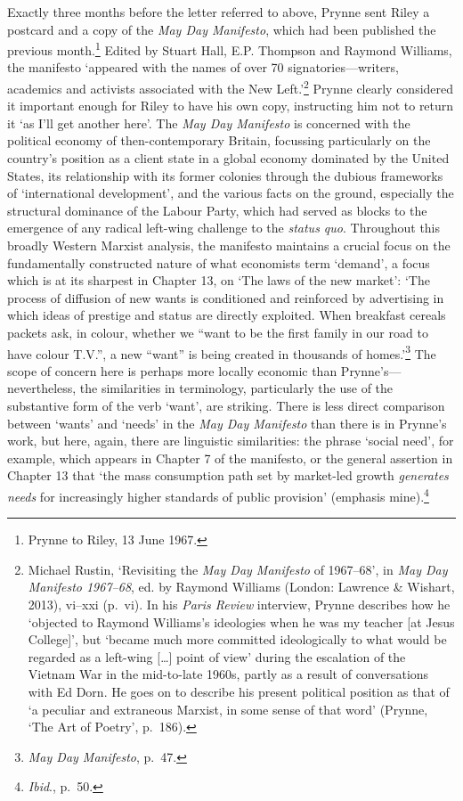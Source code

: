 \documentclass[]{article}
\begin{document}
Exactly three months before the letter referred to above, Prynne sent
Riley a postcard and a copy of the \emph{May Day Manifesto}, which had
been published the previous month.\footnote{Prynne to Riley, 13 June
  1967.} Edited by Stuart Hall, E.P. Thompson and Raymond Williams, the
manifesto `appeared with the names of over 70 signatories---writers,
academics and activists associated with the New Left.'\footnote{Michael
  Rustin, `Revisiting the \emph{May Day Manifesto} of 1967--68', in
  \emph{May Day Manifesto 1967--68}, ed. by Raymond Williams (London:
  Lawrence \& Wishart, 2013), vi--xxi (p.~vi). In his \emph{Paris
  Review} interview, Prynne describes how he `objected to Raymond
  Williams's ideologies when he was my teacher {[}at Jesus College{]}',
  but `became much more committed ideologically to what would be
  regarded as a left-wing {[}\ldots{}{]} point of view' during the
  escalation of the Vietnam War in the mid-to-late 1960s, partly as a
  result of conversations with Ed Dorn. He goes on to describe his
  present political position as that of `a peculiar and extraneous
  Marxist, in some sense of that word' (Prynne, `The Art of Poetry',
  p.~186).} Prynne clearly considered it important enough for Riley to
have his own copy, instructing him not to return it `as I'll get another
here'. The \emph{May Day Manifesto} is concerned with the political
economy of then-contemporary Britain, focussing particularly on the
country's position as a client state in a global economy dominated by
the United States, its relationship with its former colonies through the
dubious frameworks of `international development', and the various facts
on the ground, especially the structural dominance of the Labour Party,
which had served as blocks to the emergence of any radical left-wing
challenge to the \emph{status quo}. Throughout this broadly Western
Marxist analysis, the manifesto maintains a crucial focus on the
fundamentally constructed nature of what economists term `demand', a
focus which is at its sharpest in Chapter 13, on `The laws of the new
market': `The process of diffusion of new wants is conditioned and
reinforced by advertising in which ideas of prestige and status are
directly exploited. When breakfast cereals packets ask, in colour,
whether we ``want to be the first family in our road to have colour
T.V.'', a new ``want'' is being created in thousands of
homes.'\footnote{\emph{May Day Manifesto}, p.~47.} The scope of concern
here is perhaps more locally economic than Prynne's---nevertheless, the
similarities in terminology, particularly the use of the substantive
form of the verb `want', are striking. There is less direct comparison
between `wants' and `needs' in the \emph{May Day Manifesto} than there
is in Prynne's work, but here, again, there are linguistic similarities:
the phrase `social need', for example, which appears in Chapter 7 of the
manifesto, or the general assertion in Chapter 13 that `the mass
consumption path set by market-led growth \emph{generates needs} for
increasingly higher standards of public provision' (emphasis
mine).\footnote{\emph{Ibid}., p.~50.}
\end{document}
